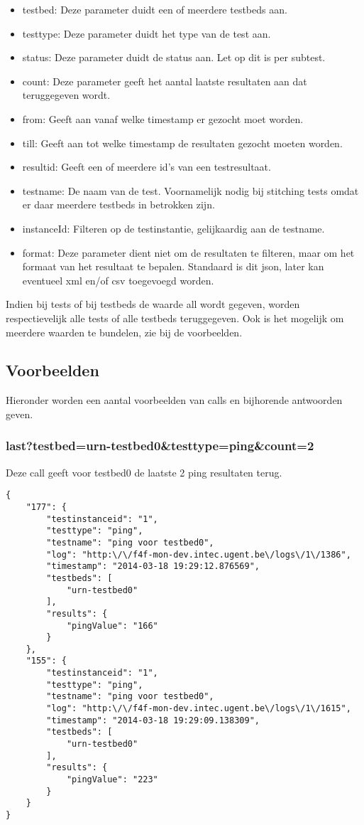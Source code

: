 \begin{itemize}
\item testbed: Deze parameter duidt een of meerdere testbeds aan.
\item testtype: Deze parameter duidt het type van de test aan.
\item status: Deze parameter duidt de status aan. Let op dit is per subtest.
\item count: Deze parameter geeft het aantal laatste resultaten aan dat teruggegeven wordt. 
\item from: Geeft aan vanaf welke timestamp er gezocht moet worden.
\item till: Geeft aan tot welke timestamp de resultaten gezocht moeten worden.
\item resultid: Geeft een of meerdere id\rq s van een testresultaat.
\item testname: De naam van de test. Voornamelijk nodig bij stitching tests omdat er daar meerdere testbeds in betrokken zijn.
\item instanceId: Filteren op de testinstantie, gelijkaardig aan de testname.
\item format: Deze parameter dient niet om de resultaten te filteren, maar om het formaat van het resultaat te bepalen. Standaard is dit json, later kan eventueel xml en/of csv toegevoegd worden.
\end{itemize}
Indien bij tests of bij testbeds de waarde all wordt gegeven, worden respectievelijk alle tests of alle testbeds teruggegeven. Ook is het mogelijk om meerdere waarden te bundelen, zie bij de voorbeelden.
\clearpage

\subsection{Voorbeelden}
Hieronder worden een aantal voorbeelden van calls en bijhorende antwoorden geven.

\subsubsection{last?testbed=urn-testbed0\&testtype=ping\&count=2}
Deze call geeft voor testbed0 de laatste 2 ping resultaten terug.
\begin{verbatim}
{
    "177": {
        "testinstanceid": "1",
        "testtype": "ping",
        "testname": "ping voor testbed0",
        "log": "http:\/\/f4f-mon-dev.intec.ugent.be\/logs\/1\/1386",
        "timestamp": "2014-03-18 19:29:12.876569",
        "testbeds": [
            "urn-testbed0"
        ],
        "results": {
            "pingValue": "166"
        }
    },
    "155": {
        "testinstanceid": "1",
        "testtype": "ping",
        "testname": "ping voor testbed0",
        "log": "http:\/\/f4f-mon-dev.intec.ugent.be\/logs\/1\/1615",
        "timestamp": "2014-03-18 19:29:09.138309",
        "testbeds": [
            "urn-testbed0"
        ],
        "results": {
            "pingValue": "223"
        }
    }
}
\end{verbatim}

